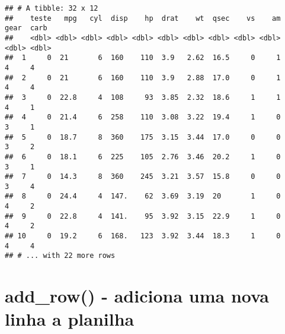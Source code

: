 \documentclass[]{book}
\newenvironment{Shaded}{\begin{snugshade}}{\end{snugshade}}
\newcommand{\DataTypeTok}[1]{\textcolor[rgb]{0.13,0.29,0.53}{#1}}
\newcommand{\DecValTok}[1]{\textcolor[rgb]{0.00,0.00,0.81}{#1}}
\newcommand{\KeywordTok}[1]{\textcolor[rgb]{0.13,0.29,0.53}{\textbf{#1}}}
\newcommand{\NormalTok}[1]{#1}
\newcommand{\OperatorTok}[1]{\textcolor[rgb]{0.81,0.36,0.00}{\textbf{#1}}}
\newcommand{\StringTok}[1]{\textcolor[rgb]{0.31,0.60,0.02}{#1}}
\begin{document}
\begin{Shaded}
\end{Shaded}

\begin{verbatim}
## # A tibble: 32 x 12
##    teste   mpg   cyl  disp    hp  drat    wt  qsec    vs    am  gear  carb
##    <dbl> <dbl> <dbl> <dbl> <dbl> <dbl> <dbl> <dbl> <dbl> <dbl> <dbl> <dbl>
##  1     0  21       6  160    110  3.9   2.62  16.5     0     1     4     4
##  2     0  21       6  160    110  3.9   2.88  17.0     0     1     4     4
##  3     0  22.8     4  108     93  3.85  2.32  18.6     1     1     4     1
##  4     0  21.4     6  258    110  3.08  3.22  19.4     1     0     3     1
##  5     0  18.7     8  360    175  3.15  3.44  17.0     0     0     3     2
##  6     0  18.1     6  225    105  2.76  3.46  20.2     1     0     3     1
##  7     0  14.3     8  360    245  3.21  3.57  15.8     0     0     3     4
##  8     0  24.4     4  147.    62  3.69  3.19  20       1     0     4     2
##  9     0  22.8     4  141.    95  3.92  3.15  22.9     1     0     4     2
## 10     0  19.2     6  168.   123  3.92  3.44  18.3     1     0     4     4
## # ... with 22 more rows
\end{verbatim}

\hypertarget{add_row---adiciona-uma-nova-linha-a-planilha}{%
\section{add\_row() - adiciona uma nova linha a planilha}\label{add_row---adiciona-uma-nova-linha-a-planilha}}

\begin{Shaded}
\end{Shaded}
\end{document}
